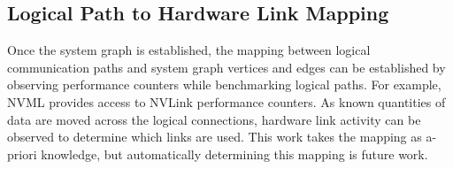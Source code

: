 \subsection{Logical Path to Hardware Link Mapping}
\label{sec:logical-hardware-mapping}

Once the system graph is established, the mapping between logical communication paths and system graph vertices and edges can be established by observing performance counters while benchmarking logical paths.
For example, NVML provides access to NVLink performance counters.
As known quantities of data are moved across the logical connections, hardware link activity can be observed to determine which links are used.
This work takes the mapping as a-priori knowledge, but automatically determining this mapping is future work.